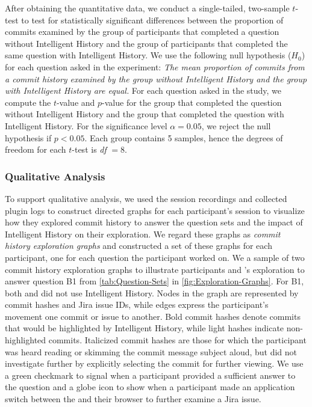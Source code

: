 After obtaining the quantitative data, we conduct a single-tailed, two-sample $t$-test to test for statistically significant differences 
between the proportion of commits examined by the group of participants that completed a question without Intelligent History and the group of participants 
that completed the same question with Intelligent History.
We use the following null hypothesis ($H_{0}$) for each question asked in the experiment: 
\textit{The mean proportion of commits from a commit history examined by the group without Intelligent History and the group with Intelligent History are equal.}
For each question asked in the study, we compute the $t$-value and $p$-value for the group that completed 
the question without Intelligent History and the group that completed the question with Intelligent History.
For the significance level $\alpha = 0.05$, we reject the null hypothesis if $p < 0.05$.
Each group contains 5 samples, hence the degrees of freedom for each $t$-test is \emph{df} $= 8$.

\subsubsection{Qualitative Analysis}

To support qualitative analysis, we used the session recordings and collected plugin logs to construct directed graphs 
for each participant's session to visualize how they explored commit history to answer the question sets 
and  the impact of Intelligent History on their exploration.
We regard these graphs as \emph{commit history exploration graphs} and constructed a set of these graphs for each participant, 
one for each question the participant worked on.
We  a sample of two commit history exploration graphs to illustrate 
participants  and ’s exploration to answer question B1 
from \autoref{tab:Question-Sets} in \autoref{fig:Exploration-Graphs}.
For B1, both   and  did not use Intelligent History.
Nodes in the graph are represented by commit hashes and Jira issue IDs, 
while edges express the participant's movement  one commit or issue to another.
Bold commit hashes denote commits that would be highlighted by Intelligent History, 
while light hashes indicate non-highlighted commits.
Italicized commit hashes are those for which the participant was heard reading or skimming the commit message subject aloud, 
but did not investigate further by explicitly selecting the commit for further viewing.
We use a green checkmark to signal when a participant provided a sufficient answer to the question 
and a globe icon to show when a participant made an application switch between the  
and their browser to further examine a Jira issue.

